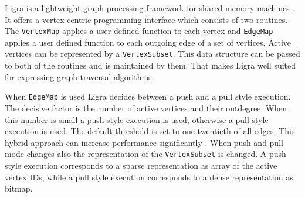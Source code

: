 
Ligra is a lightweight graph processing framework for shared memory machines \cite{Ligra}. 
It offers a vertex-centric programming interface which consists of two routines. 
The \texttt{VertexMap} applies a user defined function to each vertex and \texttt{EdgeMap} applies a user defined function to each outgoing edge of a set of vertices. 
Active vertices can be represented by a \texttt{VertexSubset}. 
This data structure can be passed to both of the routines and is maintained by them. 
That makes Ligra well suited for expressing graph traversal algorithms.

When \texttt{EdgeMap} is used Ligra decides between a push and a pull style execution.
The decisive factor is the number of active vertices and their outdegree.
When this number is small a push style execution is used, otherwise a pull style execution is used.
The default threshold is set to one twentieth of all edges.
This hybrid approach can increase performance significantly \cite{hybridBFS}.
When push and pull mode changes also the representation of the \texttt{VertexSubset} is changed. A push style execution corresponds to a sparse representation as array of the active vertex IDs, while a pull style execution corresponds to a dense representation as bitmap.

